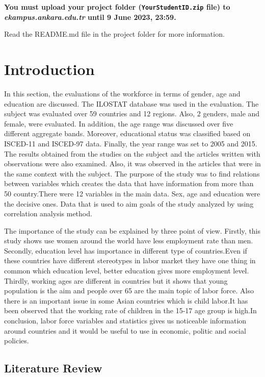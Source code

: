 \documentclass[
  12pt,
]{article}
\begin{document}
\textbf{You must upload your project folder (\texttt{YourStudentID.zip} file) to \emph{ekampus.ankara.edu.tr} until 9 June 2023, 23:59.}

\colorbox{WildStrawberry}{Read the README.md file in the project folder for more information.}

\hypertarget{introduction}{%
\section{Introduction}\label{introduction}}

In this section, the evaluations of the workforce in terms of gender, age and education are discussed. The ILOSTAT database was used in the evaluation. The subject was evaluated over 59 countries and 12 regions. Also, 2 genders, male and female, were evaluated. In addition, the age range was discussed over five different aggregate bands. Moreover, educational status was classified based on ISCED-11 and ISCED-97 data. Finally, the year range was set to 2005 and 2015. The results obtained from the studies on the subject and the articles written with observations were also examined. Also, it was observed in the articles that were in the same context with the subject. The purpose of the study was to find relations between variables which creates the data that have information from more than 50 country.There were 12 variables in the main data. Sex, age and education were the decisive ones. Data that is used to aim goals of the study analyzed by using correlation analysis method.

The importance of the study can be explained by three point of view. Firstly, this study shows use women around the world have less employment rate than men. Secondly, education level has importance in different type of countries.Even if these countries have different stereotypes in labor market they have one thing in common which education level, better education gives more employment level. Thirdly, working ages are different in countries but it shows that young population is the aim and people over 65 are the main topic of labor force. Also there is an important issue in some Asian countries which is child labor.It has been observed that the working rate of children in the 15-17 age group is high.In conclusion, labor force variables and statistics gives us noticeable information around countries and it would be useful to use in economic, politic and social policies.

\hypertarget{literature-review}{%
\subsection{Literature Review}\label{literature-review}}
\end{document}
